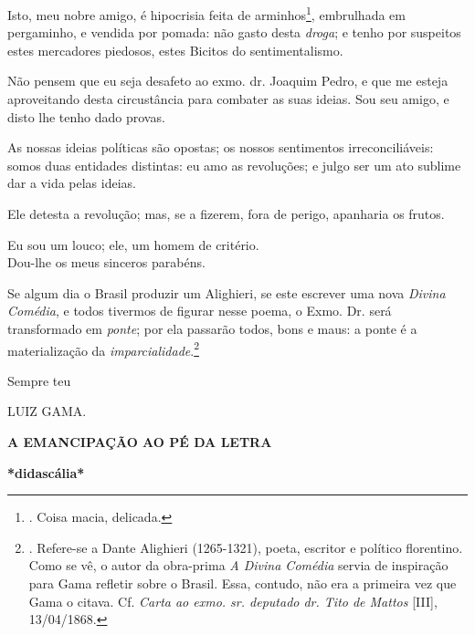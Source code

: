 Isto, meu nobre amigo, é hipocrisia feita de arminhos\footnote{. Coisa
  macia, delicada.}, embrulhada em pergaminho, e vendida por pomada: não
gasto desta \emph{droga}; e tenho por suspeitos estes mercadores
piedosos, estes Bicitos do sentimentalismo.

Não pensem que eu seja desafeto ao exmo. dr. Joaquim Pedro, e que me
esteja aproveitando desta circustância para combater as suas ideias. Sou
seu amigo, e disto lhe tenho dado provas.

As nossas ideias políticas são opostas; os nossos sentimentos
irreconciliáveis: somos duas entidades distintas: eu amo as revoluções;
e julgo ser um ato sublime dar a vida pelas ideias.

Ele detesta a revolução; mas, se a fizerem, fora de perigo, apanharia os
frutos.

Eu sou um louco; ele, um homem de critério.\\
Dou-lhe os meus sinceros parabéns.

Se algum dia o Brasil produzir um Alighieri, se este escrever uma nova
\emph{Divina Comédia}, e todos tivermos de figurar nesse poema, o Exmo.
Dr. será transformado em \emph{ponte}; por ela passarão todos, bons e
maus: a ponte é a materialização da \emph{imparcialidade}.\footnote{.
  Refere-se a Dante Alighieri (1265-1321), poeta, escritor e político
  florentino. Como se vê, o autor da obra-prima \emph{A Divina Comédia}
  servia de inspiração para Gama refletir sobre o Brasil. Essa, contudo,
  não era a primeira vez que Gama o citava. Cf. \emph{Carta ao exmo. sr.
  deputado dr. Tito de Mattos} {[}III{]}, 13/04/1868.}

Sempre teu

LUIZ GAMA.

\textbf{A EMANCIPAÇÃO AO PÉ
DA LETRA}

\textbf{*didascália*}

